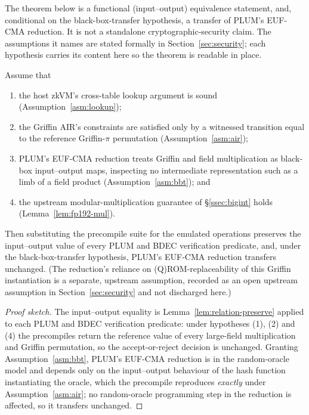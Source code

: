 The theorem below is a functional (input--output) equivalence statement, and, conditional on the black-box-transfer hypothesis, a transfer of PLUM's EUF-CMA reduction. It is not a standalone cryptographic-security claim. The assumptions it names are stated formally in Section~\ref{sec:security}; each hypothesis carries its content here so the theorem is readable in place.

\begin{theorem}\label{thm:precompile-sound}
Assume that
\begin{enumerate}
  \item the host zkVM's cross-table lookup argument is sound (Assumption~\ref{asm:lookup});
  \item the Griffin AIR's constraints are satisfied only by a witnessed transition equal to the reference Griffin-$\pi$ permutation (Assumption~\ref{asm:air});
  \item PLUM's EUF-CMA reduction treats Griffin and field multiplication as black-box input--output maps, inspecting no intermediate representation such as a limb of a field product (Assumption~\ref{asm:bbt}); and
  \item the upstream modular-multiplication guarantee of \S\ref{ssec:bigint} holds (Lemma~\ref{lem:fp192-mul}).
\end{enumerate}
Then substituting the precompile suite for the emulated operations preserves the input--output value of every PLUM and BDEC verification predicate, and, under the black-box-transfer hypothesis, PLUM's EUF-CMA reduction transfers unchanged. (The reduction's reliance on (Q)ROM-replaceability of this Griffin instantiation is a separate, upstream assumption, recorded as an open upstream assumption in Section~\ref{sec:security} and not discharged here.)
\end{theorem}

\begin{proof}[Proof sketch]
The input--output equality is Lemma~\ref{lem:relation-preserve} applied to each PLUM and BDEC verification predicate: under hypotheses (1), (2) and (4) the precompiles return the reference value of every large-field multiplication and Griffin permutation, so the accept-or-reject decision is unchanged. Granting Assumption~\ref{asm:bbt}, PLUM's EUF-CMA reduction is in the random-oracle model and depends only on the input--output behaviour of the hash function instantiating the oracle, which the precompile reproduces \emph{exactly} under Assumption~\ref{asm:air}; no random-oracle programming step in the reduction is affected, so it transfers unchanged.
\end{proof}


